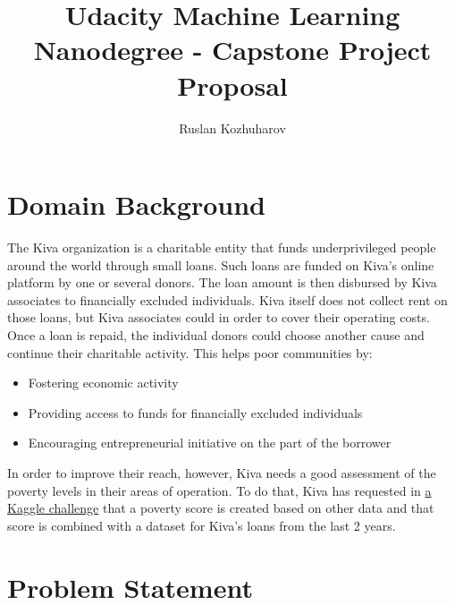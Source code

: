 \documentclass{article}
\title{Udacity Machine Learning Nanodegree - Capstone Project Proposal}
\author{Ruslan Kozhuharov}
\begin{document}
\maketitle
\tableofcontents
\newpage
{}

\section{Domain Background}

The Kiva organization is a charitable entity that funds underprivileged people around the world through small loans. Such loans are funded on Kiva’s online platform by one or several donors. The loan amount is then disbursed by Kiva associates to financially excluded individuals. Kiva itself does not collect rent on those loans, but Kiva associates could in order to cover their operating costs. Once a loan is repaid, the individual donors could choose another cause and continue their charitable activity. This helps poor communities by:
\begin{itemize}
  \item Fostering economic activity
  \item Providing access to funds for financially excluded individuals
  \item Encouraging entrepreneurial initiative on the part of the borrower
\end{itemize}
In order to improve their reach, however, Kiva needs a good assessment of the poverty levels in their areas of operation. To do that, Kiva has requested in \href{https://www.kaggle.com/kiva/data-science-for-good-kiva-crowdfunding}{a Kaggle challenge} that a poverty score is created based on other data and that score is combined with a dataset for Kiva’s loans from the last 2 years.
\section{Problem Statement}
\end{document}
